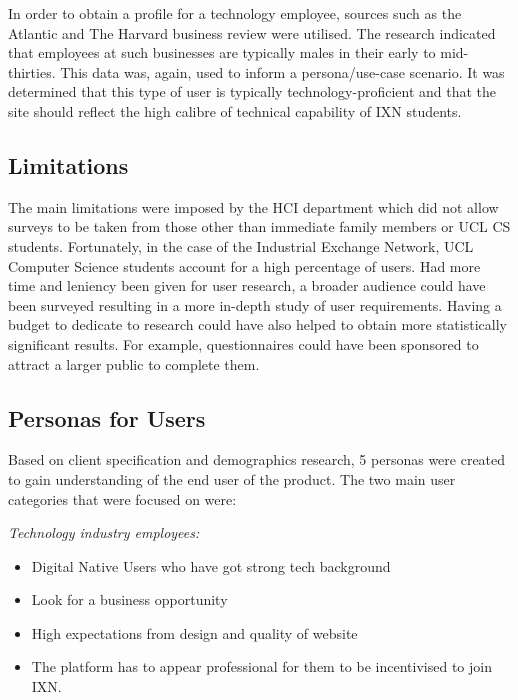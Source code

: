 \documentclass[fontsize=11pt]{extarticle}
\numberwithin{figure}{section} %
\numberwithin{table}{section}%
\providecommand{\tightlist}{%
  \setlength{\itemsep}{0pt}\setlength{\parskip}{0pt}}
\begin{document}
In order to obtain a profile for a technology employee, sources such as
the Atlantic \cite{ps4} and The Harvard business review \cite{ps5} were
utilised. The research indicated that employees at such businesses are
typically males in their early to mid-thirties. This data was, again,
used to inform a persona/use-case scenario. It was determined that this
type of user is typically technology-proficient and that the site should
reflect the high calibre of technical capability of IXN students.

\hypertarget{limitations}{%
\subsection{Limitations}\label{limitations}}

The main limitations were imposed by the HCI department which did not
allow surveys to be taken from those other than immediate family members
or UCL CS students. Fortunately, in the case of the Industrial Exchange
Network, UCL Computer Science students account for a high percentage of
users. Had more time and leniency been given for user research, a
broader audience could have been surveyed resulting in a more in-depth
study of user requirements. Having a budget to dedicate to research
could have also helped to obtain more statistically significant results.
For example, questionnaires could have been sponsored to attract a
larger public to complete them.

\hypertarget{personas-for-users}{%
\subsection{Personas for Users}\label{personas-for-users}}

Based on client specification and demographics research, 5 personas were
created to gain understanding of the end user of the product. The two
main user categories that were focused on were: ​

\emph{Technology industry employees:}​

\begin{itemize}
\tightlist
\item
  Digital Native Users who have got strong tech background​
\item
  Look for a business opportunity​
\item
  High expectations from design and quality of website​
\item
  The platform has to appear professional for them to be incentivised to
  join IXN​.
\end{itemize}
\end{document}

